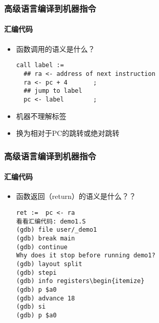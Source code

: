 \documentclass[UTF8]{ctexbeamer}
\begin{document}
\begin{frame}[fragile]
\frametitle{高级语言编译到机器指令}
\framesubtitle{汇编代码}
	
\begin{itemize}
	
	\item 函数调用的语义是什么？	


\begin{lstlisting}
call label :=
  ## ra <- address of next instruction
  ra <- pc + 4       ;
  ## jump to label
  pc <- label        ; 
\end{lstlisting}
\item 机器不理解标签
\item 换为相对于PC的跳转或绝对跳转	
\end{itemize}

\end{frame}




\begin{frame}[fragile]
	\frametitle{高级语言编译到机器指令}
	\framesubtitle{汇编代码}
	
	\begin{itemize}
		
		\item 函数返回（return）的语义是什么？？	
		
		
		\begin{lstlisting}
ret :=  pc <- ra
看看汇编代码: demo1.S
(gdb) file user/_demo1
(gdb) break main
(gdb) continue
Why does it stop before running demo1?
(gdb) layout split
(gdb) stepi
(gdb) info registers\begin{itemize}
(gdb) p $a0
(gdb) advance 18
(gdb) si
(gdb) p $a0
\end{lstlisting}

	\end{itemize}
	
\end{frame}
\end{document}
